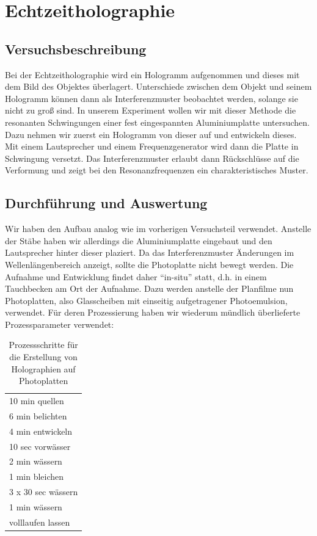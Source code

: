 \section{Echtzeitholographie}
\subsection{Versuchsbeschreibung}
Bei der Echtzeitholographie wird ein Hologramm aufgenommen und dieses mit dem Bild des Objektes überlagert. Unterschiede zwischen dem Objekt und seinem Hologramm können dann als Interferenzmuster beobachtet werden, solange sie nicht zu groß sind. In unserem Experiment wollen wir mit dieser Methode die resonanten Schwingungen einer fest eingespannten Aluminiumplatte untersuchen. Dazu nehmen wir zuerst ein Hologramm von dieser auf und entwickeln dieses. Mit einem Lautsprecher und einem Frequenzgenerator wird dann die Platte in Schwingung versetzt. Das Interferenzmuster erlaubt dann Rückschlüsse auf die Verformung und zeigt bei den Resonanzfrequenzen ein charakteristisches Muster.

\subsection{Durchführung und Auswertung}

Wir haben den Aufbau analog wie im vorherigen Versuchsteil verwendet. Anstelle der Stäbe haben wir allerdings die Aluminiumplatte eingebaut und den Lautsprecher hinter dieser plaziert. Da das Interferenzmuster Änderungen im Wellenlängenbereich anzeigt, sollte die Photoplatte nicht bewegt werden. Die Aufnahme und Entwicklung findet daher "`in-situ"' statt, d.h. in einem Tauchbecken am Ort der Aufnahme. Dazu werden anstelle der Planfilme nun Photoplatten, also Glasscheiben mit einseitig aufgetragener Photoemulsion, verwendet. Für deren Prozessierung haben wir wiederum mündlich überlieferte \cite{lena_christian} Prozessparameter verwendet:

\begin{table}
 \begin{tabular}{l}
  10 min quellen\\
  6 min belichten\\
  4 min entwickeln\\
  10 sec vorwässer\\
  2 min wässern\\
  1 min bleichen\\
  3 x 30 sec wässern\\
  1 min wässern\\
  volllaufen lassen
 \end{tabular}
 \caption{Prozessschritte für die Erstellung von Holographien auf Photoplatten}
\end{table}

